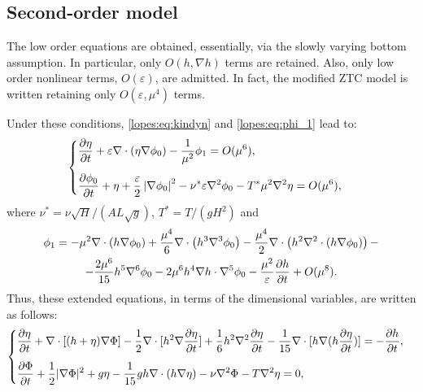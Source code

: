 
\subsection{Second-order model}\label{lopes:subsec:ztc}
The low order equations are obtained, essentially, via
the slowly varying bottom assumption. In
particular, only  \(O(h,\nabla h)\) terms are
retained.
Also, only low order  nonlinear terms, \(O(\varepsilon)\), are admitted.
In fact, the modified ZTC model is  written retaining
only \(O(\varepsilon,\mu^4)\) terms.

Under these conditions,  \eqref{lopes:eq:kindyn}
and \eqref{lopes:eq:phi_1} lead to:
\begin{equation}\label{lopes:eq:kindyn2}
\begin{cases}
\displaystyle\fpar{\eta}{t}+\varepsilon\nabla\cdot(\eta\nabla\phi_0)-\frac{1}{\mu^2}\phi_1=O(\mu^{6}),\vspace{0.3cm} \\
\displaystyle\fpar{\phi_0}{t}+\eta +
\frac{\varepsilon}{2} \left|\nabla\phi_0\right|^2-\nu^*\varepsilon\nabla^2\phi_0-T^*\mu^2\nabla^2\eta
=O(\mu^{6}),
\end{cases}
\end{equation}
where \(\nu^*=\nu\sqrt{H}/(AL\sqrt{g})\), \(T^*= T/(gH^2)\)
and
\begin{multline}\label{lopes:eq:phi_2}
\phi_1=
-\mu^{2}\nabla\cdot\left(h\nabla\phi_0\right)
+\frac{\mu^{4}}{6}\nabla\cdot\left(h^3\nabla^3\phi_0\right)
-\frac{\mu^{4}}{2}\nabla\cdot\left(h^2
\nabla^2\cdot\left(h\nabla\phi_0\right) \right)-\\
-\frac{2\mu^6}{15}h^5\nabla^6\phi_0-2\mu^6h^4\nabla h\cdot\nabla^5\phi_0
-\frac{\mu^2}{\varepsilon}\frac{\partial h}{\partial t}+O(\mu^{8}).
\end{multline}
Thus, these extended equations, in terms of the dimensional
variables, are written as follows:
\begin{equation}\label{lopes:eq:ztc}
\begin{cases}
\displaystyle \frac{\partial\eta}{\partial t} +\nabla\cdot[(h+\eta)\nabla{\Phi}]
-\frac{1}{2}\nabla\cdot [h^{2}\nabla\frac{\partial \eta}
{\partial t}]
+\frac{1}{6}h^{2}\nabla^2\frac{\partial\eta}{\partial t}
-\frac{1}{15}\nabla\cdot[h\nabla(h\frac{\partial\eta}
{\partial t})]=-\fpar{h}{t},\vspace{0.3cm} \\
\displaystyle \frac{\partial \Phi}{\partial t}
+\frac{1}{2}|\nabla\Phi|^2+g\eta-
\frac{1}{15}gh\nabla\cdot(h\nabla\eta)-\nu\nabla^2\Phi-T\nabla^2\eta=0,
\end{cases}
\end{equation}
